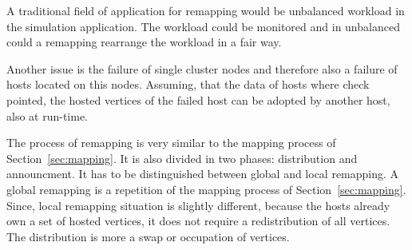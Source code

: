 A traditional field of application for remapping would be unbalanced
workload in the simulation application. The workload could be
monitored and in unbalanced could a remapping rearrange the workload
in a fair way.

Another issue is the failure of single cluster nodes and therefore
also a failure of hosts located on this nodes. Assuming, that the data
of hosts where check pointed, the hosted vertices of the failed host
can be adopted by another host, also at run-time.

The process of remapping is very similar to the mapping process of
Section~\ref{sec:mapping}.  It is also divided in two phases:
distribution and announcment. It has to be distinguished between
global and local remapping. A global remapping is a repetition of the
mapping process of Section~\ref{sec:mapping}.  Since, local remapping
situation is slightly different, because the hosts already own a set
of hosted vertices, it does not require a redistribution of all
vertices.  The distribution is more a swap or occupation of vertices.

\cleardoublepage

